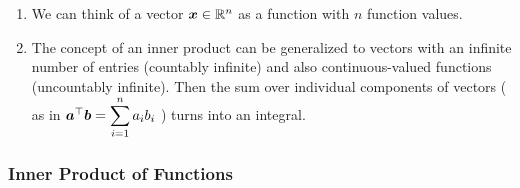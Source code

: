 \begin{enumerate}
    \item We can think of a vector $\bm{x} \in \mathbb{R}^n$ as a function with $n$ function values.
    \hfill \cite{mfml/book/mml/Deisenroth-Faisal-Ong}

    \item The concept of an inner product can be generalized to vectors with an infinite number of entries (countably infinite) and also continuous-valued functions (uncountably infinite).
    Then the sum over individual components of vectors ( as in $\bm{a}^\top \bm{b} = \displaystyle\sum^n_{i=1} a_i b_i$ ) turns into an integral.
    \hfill \cite{mfml/book/mml/Deisenroth-Faisal-Ong}

    
\end{enumerate}




\subsubsection{Inner Product of Functions}



